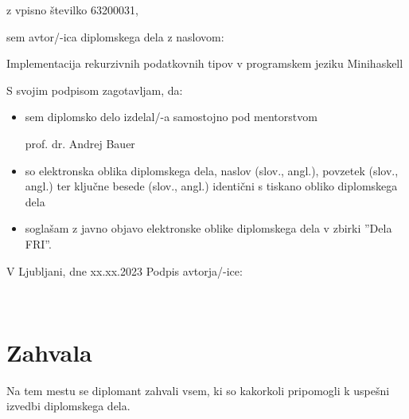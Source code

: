 \documentclass[12pt,a4paper,openany]{book}
\begin{document}
\vspace{0.5cm}
z vpisno številko \hspace{0.5cm} 63200031,

\vspace{1cm}
sem avtor/-ica diplomskega dela z naslovom:
   
\vspace{0.5cm}
Implementacija rekurzivnih podatkovnih tipov v programskem jeziku Minihaskell

\vspace{1.5cm}
S svojim podpisom zagotavljam, da:
\begin{itemize}
	\item sem diplomsko delo izdelal/-a samostojno pod mentorstvom 
	
	prof. dr. Andrej Bauer
	
	\item	so elektronska oblika diplomskega dela, naslov (slov., angl.), povzetek (slov., angl.) ter ključne besede (slov., 			angl.) identični s tiskano obliko diplomskega dela
	\item soglašam z javno objavo elektronske oblike diplomskega dela v zbirki ''Dela FRI''.
\end{itemize}

\vspace{1cm}
V Ljubljani, dne xx.xx.2023 \hspace{1cm} Podpis avtorja/-ice:

\newpage 


\ \thispagestyle{empty}

\newpage



\chapter*{Zahvala}

\thispagestyle{empty}

Na tem mestu se diplomant zahvali vsem, ki so kakorkoli pripomogli k uspešni izvedbi diplomskega dela.


\newpage


\ \thispagestyle{empty}
\end{document}
